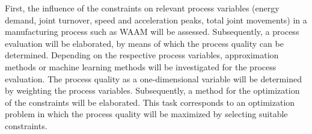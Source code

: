 First, the influence of the constraints on relevant process variables (energy demand, joint turnover, speed and acceleration peaks, total joint movements) in a manufacturing process such as \acrshort{WAAM} will be assessed. Subsequently, a process evaluation will be elaborated, by means of which the process quality can be determined. Depending on the respective process variables, approximation methods or machine learning methods will be investigated for the process evaluation. The process quality as a one-dimensional variable will be determined by weighting the process variables. Subsequently, a method for the optimization of the constraints will be elaborated. This task corresponds to an optimization problem in which the process quality will be maximized by selecting suitable constraints. 
